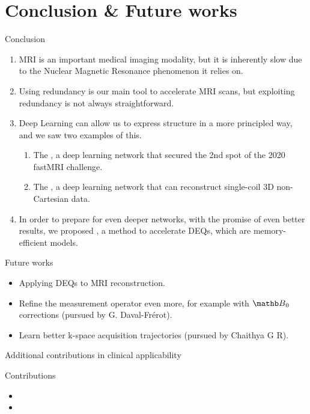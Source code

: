 \documentclass[aspectratio=169,xcolor=dvipsnames]{beamer}
\begin{document}
\section{Conclusion \& Future works}

\begin{frame}{Conclusion}
    \begin{enumerate}[<+->]
        \item MRI is an important medical imaging modality, but it is inherently slow due to the Nuclear Magnetic Resonance phenomenon it relies on.
        \item Using redundancy is our main tool to accelerate MRI scans, but exploiting redundancy is not always straightforward.
        \item Deep Learning can allow us to express structure in a more principled way, and we saw two examples of this.
        \begin{enumerate}[<+->]
            \item The , a deep learning network that secured the 2nd spot of the 2020 fastMRI challenge.
            \item The , a deep learning network that can reconstruct single-coil 3D non-Cartesian data.
        \end{enumerate}
        \item In order to prepare for even deeper networks, with the promise of even better results, we proposed , a method to accelerate DEQs, which are memory-efficient models.
    \end{enumerate}
\end{frame}

\begin{frame}{Future works}
    \begin{itemize}
        \item Applying DEQs to MRI reconstruction.
        \item Refine the measurement operator even more, for example with $\Bb_0$ corrections (pursued by G. Daval-Fr\'{e}rot).
        \item Learn better k-space acquisition trajectories (pursued by Chaithya G R).
    \end{itemize}
\end{frame}

\begin{frame}{Additional contributions in clinical applicability}
    \begin{exampleblock}{Contributions}
        \begin{itemize}
            \item {}
            \item {}
        \end{itemize}
    \end{exampleblock}
\end{frame}
\end{document}
